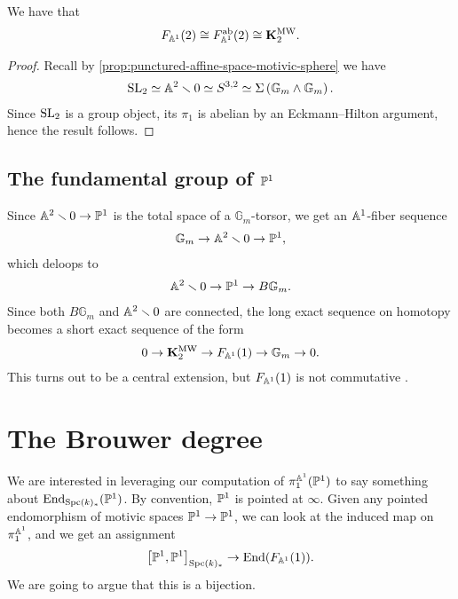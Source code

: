 \documentclass[11pt,openany]{book}
\let\smashprod\wedge
\providecommand{\KMW}{\mathbf{K}^\mathrm{MW}}
\begin{document}
\begin{proposition} We have that 
\begin{align*}
    F_{\A^1}(2) \cong F_{\A^1}^\ab(2) \cong \KMW_2.
\end{align*}
\end{proposition}
\begin{proof} Recall by \autoref{prop:punctured-affine-space-motivic-sphere} we have
\begin{align*}
    \SL_2 \simeq \A^2 \minus 0 \simeq S^{3,2} \simeq \Sigma \left( \mathbb{G}_m \smashprod \mathbb{G}_m \right).
\end{align*}
Since $\SL_2$ is a group object, its $\pi_1$ is abelian by an Eckmann--Hilton argument, hence the result follows.
\end{proof}


\subsection{The fundamental group of $\P^1$}

Since $\A^2\minus 0 \to \P^1$ is the total space of a $\mathbb{G}_m$-torsor, we get an $\A^1$-fiber sequence
\begin{align*}
    \mathbb{G}_m \to \A^2\minus 0 \to \P^1,
\end{align*}
which deloops to
\begin{align*}
    \A^2 \minus 0 \to \P^1 \to B \mathbb{G}_m.
\end{align*}
%
Since both $B \mathbb{G}_m$ and $\A^2\minus 0$ are connected, the long exact sequence on homotopy becomes a short exact sequence of the form \cite[(7.4)]{Morel}
\begin{align*}
    0 \to \KMW_2 \to F_{\A^1}(1) \to \mathbb{G}_m \to 0.    
\end{align*}
%
This turns out to be a central extension, but $F_{\A^1}(1)$ is not commutative \cite[7.29]{Morel}.


\section{The Brouwer degree}

We are interested in leveraging our computation of $\pi_1^{\A^1}(\P^1)$ to say something about $\End_{\Spc(k)_\ast}(\P^1)$. By convention, $\P^1$ is pointed at $\infty$. Given any pointed endomorphism of motivic spaces $\P^1 \to \P^1$, we can look at the induced map on $\pi_1^{\A^1}$, and we get an assignment
\begin{equation}\label{eqn:end-p1-end-fa1}
\begin{aligned}
    \left[ \P^1,\P^1 \right]_{\Spc(k)_\ast} \to \End(F_{\A^1}(1)).
\end{aligned}
\end{equation}
%
We are going to argue that this is a bijection.
\end{document}

